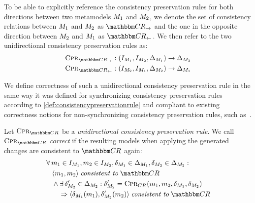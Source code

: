 To be able to explicitly reference the consistency preservation rules for both directions between two metamodels $M_{1}$ and $M_{2}$, we denote the set of consistency relations between $M_{1}$ and $M_{2}$ as $\consistencyrelationset{CR}_{\rightarrow}$ and the one in the opposite direction between $M_{2}$ and $M_{1}$ as $\consistencyrelationset{CR}_{\leftarrow}$.
We then refer to the two unidirectional consistency preservation rules as:
\begin{align*}
    \consistencypreservationrule{\consistencyrelationset{CR}_{\rightarrow}} : (\metamodelinstanceset{M}{1}, \metamodelinstanceset{M}{2}, \changeuniverse{\metamodel{M}{1}}) \rightarrow \changeuniverse{\metamodel{M}{2}}\\
    \consistencypreservationrule{\consistencyrelationset{CR}_{\leftarrow}} : (\metamodelinstanceset{M}{2}, \metamodelinstanceset{M}{1}, \changeuniverse{\metamodel{M}{2}}) \rightarrow \changeuniverse{\metamodel{M}{1}}
\end{align*}

We define correctness of such a unidirectional consistency preservation rule in the same way it was defined for synchronizing consistency preservation rules according to \autoref{def:consistencypreservationrule} and compliant to existing correctness notions for non-synchronizing consistency preservation rules, such as~\cite{stevens2010sosym}.

\begin{definition}
    \label{def:unidirectionalconsistencypreservationrulecorrectness}
    Let $\consistencypreservationrule{\consistencyrelationset{CR}}$ be a \emph{unidirectional consistency preservation rule}.
    We call $\consistencypreservationrule{\consistencyrelationset{CR}}$ \emph{correct} if the resulting models when applying the generated changes are consistent to $\consistencyrelationset{CR}$ again:
    \begin{align*}
        &
        \forall 
        \model{m}{1} \in \metamodelinstanceset{M}{1}, 
        \model{m}{2} \in \metamodelinstanceset{M}{2},
        \change{\metamodel{M}{1}} \in \changeuniverse{\metamodel{M}{1}},
        \change{\metamodel{M}{2}} \in \changeuniverse{\metamodel{M}{2}} : \\
        & \formulaskip
        \tupled{\model{m}{1}, \model{m}{2}} \consistenttomath \consistencyrelationset{CR} \\
        & \formulaskip
        \land \exists 
        \change{\metamodel{M}{2}}' \in \changeuniverse{\metamodel{M}{2}} :
        \change{\metamodel{M}{2}}' = \consistencypreservationrule{\consistencyrelation{CR}{}}(\model{m}{1}, \model{m}{2}, \change{\metamodel{M}{1}}, \change{\metamodel{M}{2}}) \\
        & \formulaskip\formulaskip
        \Rightarrow
        \tupled{\change{\metamodel{M}{1}}(\model{m}{1}), \change{\metamodel{M}{2}}'(\model{m}{2})} \consistenttomath \consistencyrelationset{CR}
    \end{align*}
\end{definition}

